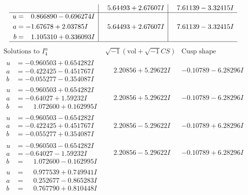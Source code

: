 \documentclass[1p]{elsarticle_modified}
\theoremstyle{definition}
\newcommand{\I}{\sqrt{-1}}
\begin{document}
$$\begin{array}{c|c|c}
 & \phantom{-}5.64493 + 2.67607 I & \phantom{-}7.61139 - 3.32415 I \\ \hline\begin{aligned}
u &= \phantom{-}0.866890 - 0.696274 I \\
a &= -1.67678 + 2.03785 I \\
b &= \phantom{-}1.105310 + 0.336093 I\end{aligned}
 & \phantom{-}5.64493 + 2.67607 I & \phantom{-}7.61139 - 3.32415 I\\
 \hline 
 \end{array}$$\newpage$$\begin{array}{c|c|c}  
\text{Solutions to }I^u_{4}& \I (\text{vol} + \sqrt{-1}CS) & \text{Cusp shape}\\
 \hline 
\begin{aligned}
u &= -0.960503 + 0.654282 I \\
a &= -0.422425 - 0.451767 I \\
b &= -0.055277 - 0.354087 I\end{aligned}
 & \phantom{-}2.20856 + 5.29622 I & -0.10789 - 6.28296 I \\ \hline\begin{aligned}
u &= -0.960503 + 0.654282 I \\
a &= -0.64027 + 1.59232 I \\
b &= \phantom{-}1.072600 + 0.162995 I\end{aligned}
 & \phantom{-}2.20856 + 5.29622 I & -0.10789 - 6.28296 I \\ \hline\begin{aligned}
u &= -0.960503 - 0.654282 I \\
a &= -0.422425 + 0.451767 I \\
b &= -0.055277 + 0.354087 I\end{aligned}
 & \phantom{-}2.20856 - 5.29622 I & -0.10789 + 6.28296 I \\ \hline\begin{aligned}
u &= -0.960503 - 0.654282 I \\
a &= -0.64027 - 1.59232 I \\
b &= \phantom{-}1.072600 - 0.162995 I\end{aligned}
 & \phantom{-}2.20856 - 5.29622 I & -0.10789 + 6.28296 I \\ \hline\begin{aligned}
u &= \phantom{-}0.977539 + 0.749941 I \\
a &= \phantom{-}0.252677 - 0.865283 I \\
b &= \phantom{-}0.767790 + 0.810448 I\end{aligned}

\end{array}$$
\end{document}
